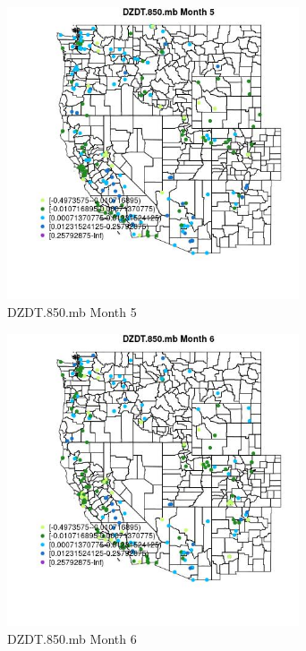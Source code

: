 \begin{figure} 
\centering  
\includegraphics[width=0.77\textwidth]{Code_Outputs/Report_ML_input_PM25_Step4_part_e_de_duplicated_aveswNAs_MapObsMo5DZDT850mb.jpg} 
\caption{\label{fig:Report_ML_input_PM25_Step4_part_e_de_duplicated_aveswNAsMapObsMo5DZDT850mb}DZDT.850.mb Month 5} 
\end{figure} 
 

\begin{figure} 
\centering  
\includegraphics[width=0.77\textwidth]{Code_Outputs/Report_ML_input_PM25_Step4_part_e_de_duplicated_aveswNAs_MapObsMo6DZDT850mb.jpg} 
\caption{\label{fig:Report_ML_input_PM25_Step4_part_e_de_duplicated_aveswNAsMapObsMo6DZDT850mb}DZDT.850.mb Month 6} 
\end{figure} 
 

